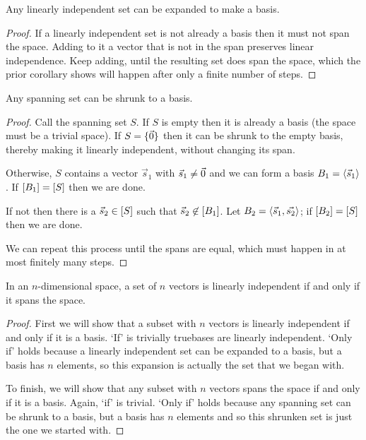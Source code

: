 \begin{corollary} \label{cor:LIExpBas}
Any linearly independent set can be expanded to make a basis.
\end{corollary}

\begin{proof}
If a linearly independent set 
is not already a basis then it must not span the space.
Adding to it a vector that is not in the span preserves linear independence.
Keep adding, 
until the resulting set does span the space, which the prior corollary
shows will happen after only a finite number of steps.
\end{proof}

\begin{corollary}
Any spanning set can be shrunk to a basis.
\end{corollary}

\begin{proof}
Call the spanning set \( S \).
If \( S \) is empty then it is already a basis (the space must be a trivial
space).
If \( S=\mbox{$\{\vec{0}\}$} \) then it can be shrunk to the empty basis,
thereby making it linearly independent, without changing its span.

Otherwise, $S$ contains a vector $\vec{s}_1$ with $\vec{s}_1\neq\vec{0}$
and we can form a basis \( B_1=\langle\vec{s}_1\rangle \).
If \( \relax [B_1\relax ]=\relax [S\relax ] \) then we are done.

If not then there is a \( \vec{s}_2\in\relax [S\relax ] \) such that
\( \vec{s}_2\not\in\relax [B_1\relax ] \).
Let \( B_2=\langle\vec{s}_1,\vec{s_2}\rangle \);
if \( \relax [B_2\relax ]=\relax [S\relax ] \) then we are done.

We can repeat this process until the spans are equal,
which must happen in at most finitely many steps.
\end{proof}

\begin{corollary}
\label{cor:NVecsRNSpanIffLI}
In an \( n \)-dimensional space, a set of \( n \) vectors is linearly 
independent if and
only if it spans the space.
\end{corollary}

\begin{proof}
First we will
show that a subset with \( n \) vectors is linearly independent if and only
if it is a basis.
`If' is trivially true\Dash bases are linearly independent.
`Only if' holds
because a linearly independent set can be expanded to a basis, but a
basis has \( n \) elements, so this 
expansion is actually the set that we began with.

To finish, we will show that any subset with \( n \) vectors spans the space 
if and only if it is a basis.
Again, `if' is trivial.
`Only if'
holds because any spanning set can be shrunk to a basis, but a basis has
\( n \) elements and so this shrunken set is just the one we started with.
\end{proof}

